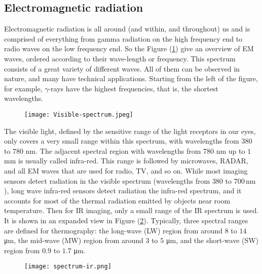 \subsection{Electromagnetic radiation}
\label{ssec:electromagnetic-radiation}
Electromagnetic radiation is all around (and within, and throughout) us and is
comprised of everything from gamma radiation on the high frequency end to radio
waves on the low frequency end. So the Figure (\ref{fig:spectrum}) give an
overview of EM waves, ordered according to their wave-length or frequency. 
This spectrum consists of a great variety of different waves. All of them can
be observed in nature, and many have technical applications. Starting from the
left of the figure, for example, $\gamma$-rays have the highest frequencies,
that is, the shortest wavelengths.\cite{vollmer2017infrared} \hfill \break
%
%
\begin{figure}[htb]
	\centering
	\texttt{[image: Visible-spectrum.jpeg]}
	\label{fig:spectrum}
\end{figure}
%
\newline
The visible light, defined by the sensitive range of the light receptors in our
eyes, only covers a very small range within this spectrum, with wavelengths from
$380$ to $780$ \si{\nano\meter}. The adjacent spectral region with wavelengths
from $780$ \si{\nano\meter} up to $1$ \si{\milli\meter} is usually called infra-red. 
This range is followed by microwaves, RADAR, and all EM waves that are used for
radio, TV, and so on.
While most imaging sensors detect radiation in the visible spectrum (wavelengths
from $380$ to $700 \,\si{\nano\meter}$), long wave infra-red sensors detect
radiation the infra-red spectrum, and it accounts for most of the thermal
radiation emitted by objects near room temperature. Then for IR imaging, only a
small range of the IR spectrum is used. It is shown in an expanded view in
Figure (\ref{fig:spectrum-ir}). Typically, three spectral ranges are defined for thermography: 
the long-wave (LW) region from around $8$ to $14$ \si{\micro\meter}, the
mid-wave (MW) region from around $3$ to $5$ \si{\micro\meter}, and the 
short-wave (SW) region from $0.9$ to $1.7$ \si{\micro\meter}.
%
%
\begin{figure}[!h]
	\centering
	\texttt{[image: spectrum-ir.png]}
	\label{fig:spectrum-ir}
\end{figure}
